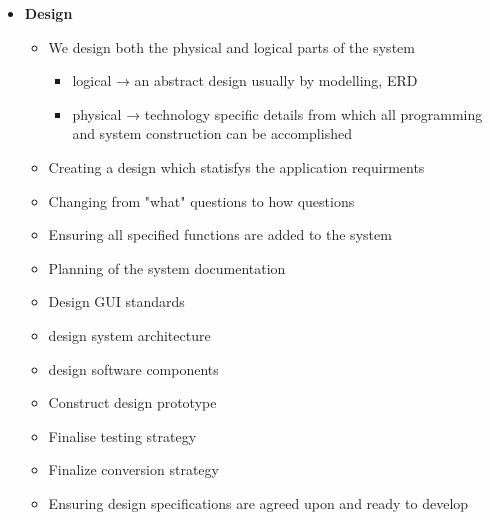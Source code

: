 \documentclass[12pt, a4, twoside]{article}
\begin{document}
\begin{itemize}
\begin{itemize}
      \item \textbf{Design}
      \begin{itemize}
        \item We design both the physical and logical parts of the system
        \begin{itemize}
          \item logical → an abstract design usually by modelling, ERD
          \item physical → technology specific details from which all programming and system construction can be accomplished
        \end{itemize}
        \item Creating a design which statisfys the application requirments
        \item Changing from "what" questions to how questions
        \item Ensuring all specified functions are added to the system
        \item Planning of the system documentation
        \item Design GUI standards
        \item design system architecture
        \item design software components
        \item Construct design prototype
        \item Finalise testing strategy
        \item Finalize conversion strategy
        \item Ensuring design specifications are agreed upon and ready to develop
        

\end{itemize}
\end{itemize}
\end{itemize}
\end{document}
